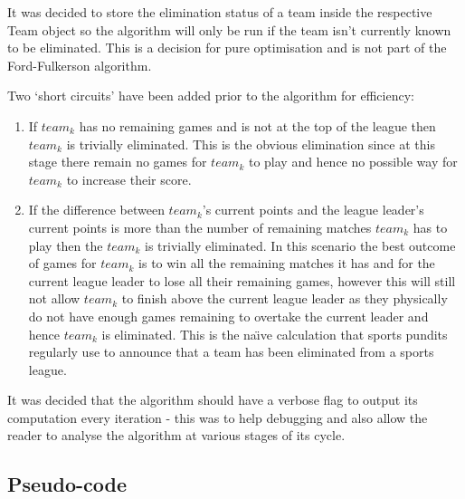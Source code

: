 It was decided to store the elimination status of a team inside the
respective Team object so the algorithm will only be run if the team isn't
currently known to be eliminated. This is a decision for pure optimisation and 
is not part of the Ford-Fulkerson algorithm.

Two `short circuits' have been added prior to the algorithm for efficiency:
\begin{enumerate}
\item If $team_k$ has no remaining games and is not at the top of the league
then $team_k$ is trivially eliminated. This is the obvious elimination since
at this stage there remain no games for $team_k$ to play and hence no possible
way for $team_k$ to increase their score.
\item If the difference between $team_k$'s current points and the league 
leader's current points is more than the number of remaining matches $team_k$ 
has to play then the $team_k$ is trivially eliminated. In this scenario the best 
outcome of games for $team_k$ is to win all the remaining matches it has and for 
the current league leader to lose all their remaining games, however this will
still not allow $team_k$ to finish above the current league leader as they
physically do not have enough games remaining to overtake the current leader and 
hence $team_k$ is eliminated. This is the na\"{\i}ve calculation that sports 
pundits regularly use to announce that a team has been eliminated from a sports 
league.
\end{enumerate}

It was decided that the algorithm should have a verbose flag to output
its computation every iteration - this was to help debugging and also
allow the reader to analyse the algorithm at various stages of its
cycle. 

\subsection{Pseudo-code}

